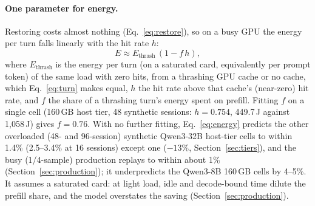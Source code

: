 \paragraph{One parameter for energy.} Restoring costs almost nothing (Eq.~\eqref{eq:restore}), so on a busy GPU the
energy per turn falls linearly with the hit rate $h$:
\begin{equation}
  E \approx E_{\text{thrash}}\,(1 - f\,h),
  \label{eq:energy}
\end{equation}
where $E_{\text{thrash}}$ is the energy per turn (on a saturated card, equivalently per prompt token) of the same load with zero hits, from a thrashing GPU cache or no cache, which Eq.~\eqref{eq:turn} makes equal, $h$ the hit rate
above that cache's (near-zero) hit rate, and $f$ the share of a thrashing turn's energy spent on prefill. Fitting $f$
on a single cell (160\,GB host tier, 48 synthetic sessions: $h=0.754$, 449.7\,J against 1,058\,J) gives $f=0.76$. With no further fitting,
Eq.~\eqref{eq:energy} predicts the other overloaded (48- and 96-session) synthetic Qwen3-32B host-tier cells to within 1.4\% (2.5--3.4\% at
16 sessions) except one ($-13\%$, Section~\ref{sec:tiers}),
and the busy (1/4-sample) production replays to within about 1\% (Section~\ref{sec:production}); it underpredicts the Qwen3-8B 160\,GB
cells by 4--5\%. It assumes a saturated card: at light
load, idle and decode-bound time dilute the prefill share, and the model overstates the saving
(Section~\ref{sec:production}).

